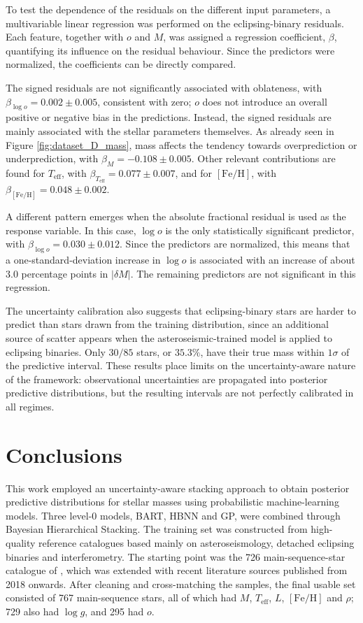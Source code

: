 To test the dependence of the residuals on the different input parameters, a multivariable linear regression was performed on the eclipsing-binary residuals. Each feature, together with $o$ and $M$, was assigned a regression coefficient, $\beta$, quantifying its influence on the residual behaviour. Since the predictors were normalized, the coefficients can be directly compared.

The signed residuals are not significantly associated with oblateness, with $\beta_{\log o} = 0.002 \pm 0.005$, consistent with zero; $o$ does not introduce an overall positive or negative bias in the predictions. Instead, the signed residuals are mainly associated with the stellar parameters themselves. As already seen in Figure \ref{fig:dataset_D_mass}, mass affects the tendency towards overprediction or underprediction, with $\beta_M = -0.108 \pm 0.005$. Other relevant contributions are found for $T_{\mathrm{eff}}$, with $\beta_{T_{\mathrm{eff}}} = 0.077 \pm 0.007$, and for $[\mathrm{Fe}/\mathrm{H}]$, with $\beta_{[\mathrm{Fe}/\mathrm{H}]} = 0.048 \pm 0.002$.

A different pattern emerges when the absolute fractional residual is used as the response variable. In this case, $\log o$ is the only statistically significant predictor, with $\beta_{\log o} = 0.030 \pm 0.012$. Since the predictors are normalized, this means that a one-standard-deviation increase in $\log o$ is associated with an increase of about $3.0$ percentage points in $|\delta M|$. The remaining predictors are not significant in this regression.

The uncertainty calibration also suggests that eclipsing-binary stars are harder to predict than stars drawn from the training distribution, since an additional source of scatter appears when the asteroseismic-trained model is applied to eclipsing binaries. Only $30/85$ stars, or $35.3\%$, have their true mass within $1\sigma$ of the predictive interval. These results place limits on the uncertainty-aware nature of the framework: observational uncertainties are propagated into posterior predictive distributions, but the resulting intervals are not perfectly calibrated in all regimes.

\section{Conclusions} \label{sec:conclusions}

This work employed an uncertainty-aware stacking approach to obtain posterior predictive distributions for stellar masses using probabilistic machine-learning models. Three level-0 models, BART, HBNN and GP, were combined through Bayesian Hierarchical Stacking. The training set was constructed from high-quality reference catalogues based mainly on asteroseismology, detached eclipsing binaries and interferometry. The starting point was the 726 main-sequence-star catalogue of \citet{moya2018}, which was extended with recent literature sources published from 2018 onwards. After cleaning and cross-matching the samples, the final usable set consisted of 767 main-sequence stars, all of which had $M$, $T_{\mathrm{eff}}$, $L$, $[\mathrm{Fe}/\mathrm{H}]$ and $\rho$; 729 also had $\log g$, and 295 had $o$.

